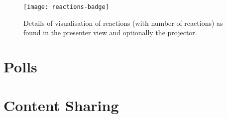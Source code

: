 \begin{figure}
\centering
\texttt{[image: reactions-badge]}
\caption{Details of visualisation of reactions (with number of reactions) as found in the presenter view and optionally the projector.}
\label{fig:design-interface-button}
\end{figure}



\section{Polls}

\section{Content Sharing}
